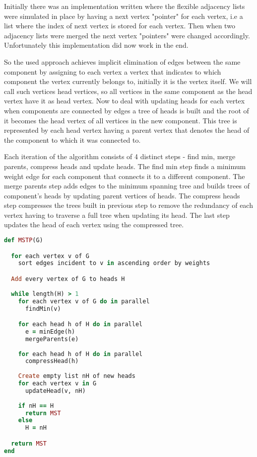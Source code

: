 \documentclass{report}
\theoremstyle{plain}
\theoremstyle{definition}
\theoremstyle{remark}
\begin{document}
Initially there was an implementation written where the flexible adjacency lists were simulated in place by having a next vertex "pointer" for each vertex, i.e a list where the index of next vertex is stored for each vertex. Then when two adjacency lists were merged the next vertex "pointers" were changed accordingly. Unfortunately this implementation did now work in the end.

So the used approach achieves implicit elimination of edges between the same component by assigning to each vertex a vertex that indicates to which component the vertex currently belongs to, initially it is the vertex itself. We will call such vertices head vertices, so all vertices in the same component as the head vertex have it as head vertex. Now to deal with updating heads for each vertex when components are connected by edges a tree of heads is built and the root of it becomes the head vertex of all vertices in the new component. This tree is represented by each head vertex having a parent vertex that denotes the head of the component to which it was connected to.

Each iteration of the algorithm consists of 4 distinct steps - find min, merge parents, compress heads and update heads. The find min step finds a minimum weight edge for each component that connects it to a different component. The merge parents step adds edges to the minimum spanning tree and builds trees of component's heads by updating parent vertices of heads. The compress heads step compresses the trees built in previous step to remove the redundancy of each vertex having to traverse a full tree when updating its head. The last step updates the head of each vertex using the compressed tree.

\begin{lstlisting}[language=Ruby]
def MSTP(G)

  for each vertex v of G
    sort edges incident to v in ascending order by weights

  Add every vertex of G to heads H
  
  while length(H) > 1
    for each vertex v of G do in parallel
      findMin(v)

    for each head h of H do in parallel
      e = minEdge(h)
      mergeParents(e)
  
    for each head h of H do in parallel
      compressHead(h)
    
    Create empty list nH of new heads
    for each vertex v in G
      updateHead(v, nH)
    
    if nH == H
      return MST
    else
      H = nH

  return MST
end
\end{lstlisting}
\end{document}
